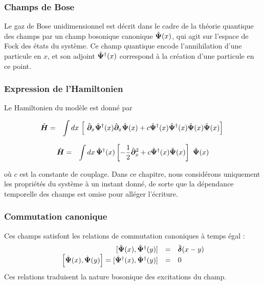 \subsubsection{Champs de Bose}

Le gaz de Bose unidimensionnel est décrit dans le cadre de la théorie quantique des champs par un champ bosonique canonique \( \hat{\bm{\Psi}}(x) \), qui agit sur l’espace de Fock des états du système. Ce champ quantique encode l’annihilation d’une particule en \( x \), et son adjoint \( \hat{\bm{\Psi}}^\dag(x) \) correspond à la création d’une particule en ce point. 


\subsubsection{Expression de l’Hamiltonien}
Le Hamiltonien du modèle est donné par

\begin{eqnarray}
	\operator{H} & = & \int dx \, \left [ \operator{\partial}_x \operator{\Psi}^\dag (x)\operator{\partial}_x \operator{\Psi}(x) + c \operator{\Psi}^\dag (x) \operator{\Psi}^\dag (x) \operator{\Psi} (x) \operator{\Psi} (x) \right ] \label{chap:1:ham.mod}
\end{eqnarray}

\begin{eqnarray}
	\operator{H} & = & \int dx \, \operator{\Psi}^\dag (x)\left [-\frac{1}{2}\operator{\partial}_x^2 + c  \operator{\Psi}^\dag (x) \operator{\Psi} (x) \right ] \operator{\Psi} (x) \label{chap:1:ham.mod}
\end{eqnarray}


où \( c \) est la constante de couplage. Dans ce chapitre, nous considérons uniquement les propriétés du système à un instant donné, de sorte que la dépendance temporelle des champs est omise pour alléger l’écriture.

\subsubsection{Commutation canonique}
Ces champs satisfont les relations de commutation canoniques à temps égal :
\begin{eqnarray}
	\left . \begin{array}{rcl}
		[ \hat{\bm{\Psi}}(x),  \hat{\bm{\Psi}}^\dagger(y) ]  &=&  \hat{\bm{\delta}}(x - y) \\
		\left [ \hat{\bm{\Psi}}(x),  \hat{\bm{\Psi}}(y) \right ]   =  [ \hat{\bm{\Psi}}^\dag(x),  \hat{\bm{\Psi}}^\dag(y) ]  &=&  0 
	\end{array} \right . \label{chap:1:com.1}
\end{eqnarray}
Ces relations traduisent la nature bosonique des excitations du champ.

